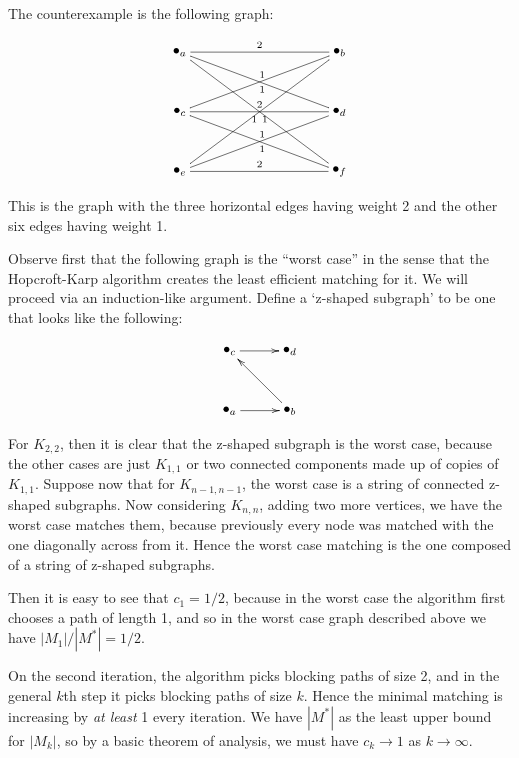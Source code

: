 \documentclass{article}
\newcommand{\problem}[1]{\noindent {\bf #1}}
\begin{document}
\problem{Problem 1.} \\
The counterexample is the following graph:

\begin{displaymath}
\xygraph{
!{<0cm,0cm>;<1cm,0cm>:<0cm,1cm>::}
!{(-4,3) }*+{\bullet_{a}}="a"
!{(0,3)}*+{\bullet_{b}}="b"
!{(-4,1.5) }*+{\bullet_{c}}="c"
!{(0,1.5) }*+{\bullet_{d}}="d"
!{(-4,0) }*+{\bullet_{e}}="e"
!{(0,0)}*+{\bullet_{f}}="f"
"a"-"b" ^ {2} "a"-"d" ^ {1} "a"-"f" _ {1}
"c"-"b" _ {1} "c"-"d" ^ {2} "c"-"f" ^ {1}
"e"-"b" _ {1} "e"-"d" _ {1} "e"-"f" ^ {2}
}
\end{displaymath}

This is the graph with the three horizontal edges having weight 2 and the other six edges having weight 1. 

\problem{Problem 2.} Observe first that the following graph is the ``worst case'' in the sense that the Hopcroft-Karp algorithm creates the least efficient matching for it. We will proceed via an induction-like argument. Define a `z-shaped subgraph' to be one that looks like the following:

\begin{displaymath}\xygraph{
!{<0cm,0cm>;<1cm,0cm>:<0cm,1cm>::}
!{(0,0) }*+{\bullet_{a}}="a"
!{(1.5,0) }*+{\bullet_{b}}="b"
!{(0,1.5) }*+{\bullet_{c}}="c"
!{(1.5,1.5)}*+{\bullet_{d}}="d"
"a":"b"
"b":"c"
"c":"d"
}
\end{displaymath}

For $K_{2,2}$, then it is clear that the z-shaped subgraph is the worst case, because the other cases are just $K_{1,1}$ or two connected components made up of copies of $K_{1,1}$. Suppose now that for $K_{n-1,n-1}$, the worst case is a string of connected z-shaped subgraphs. Now considering $K_{n,n}$, adding two more vertices, we have the worst case matches them, because previously every node was matched with the one diagonally across from it. Hence the worst case matching is the one composed of a string of z-shaped subgraphs.

Then it is easy to see that $c_1=1/2$, because in the worst case the algorithm first chooses a path of length 1, and so in the worst case graph described above we have $|M_1|/|M^{\ast}|=1/2$.

On the second iteration, the algorithm picks blocking paths of size 2, and in the general $k$th step it picks blocking paths of size $k$. Hence the minimal matching is increasing by \emph{at least} 1 every iteration. We have $|M^{\ast}|$ as the least upper bound for $|M_k|$, so by a basic theorem of analysis, we must have $c_k\to 1$ as $k\to\infty$.
\end{document}
